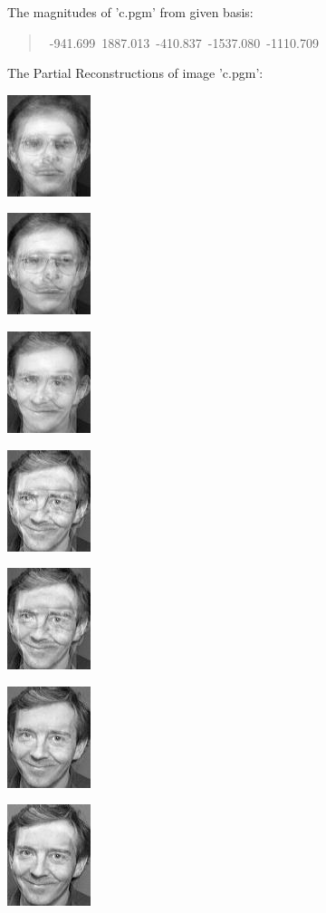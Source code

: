 \documentclass[a4paper]{article}
\begin{document}
The magnitudes of 'c.pgm' from given basis:
%
\begin{quote}{\ttfamily \raggedright {}~-941.699~1887.013~-410.837~-1537.080~-1110.709
}
\end{quote}

The Partial Reconstructions of image 'c.pgm':

\includegraphics[scale=0.500000]{NewPartRecon0.jpg}

\includegraphics[scale=0.500000]{NewPartRecon1.jpg}

\includegraphics[scale=0.500000]{NewPartRecon2.jpg}

\includegraphics[scale=0.500000]{NewPartRecon3.jpg}

\includegraphics[scale=0.500000]{NewPartRecon4.jpg}

\includegraphics[scale=0.500000]{NewPartRecon5.jpg}

\includegraphics[scale=0.500000]{NewPartRecon6.jpg}
\end{document}
